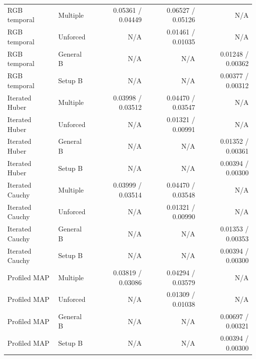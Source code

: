 \begin{longtable}{llrrr}
RGB temporal & Multiple & 0.05361 / 0.04449 & 0.06527 / 0.05126 & N/A\\
RGB temporal & Unforced & N/A & 0.01461 / 0.01035 & N/A\\
RGB temporal & General B & N/A & N/A & 0.01248 / 0.00362\\
RGB temporal & Setup B & N/A & N/A & 0.00377 / 0.00312\\
Iterated Huber & Multiple & 0.03998 / 0.03512 & 0.04470 / 0.03547 & N/A\\
Iterated Huber & Unforced & N/A & 0.01321 / 0.00991 & N/A\\
Iterated Huber & General B & N/A & N/A & 0.01352 / 0.00361\\
Iterated Huber & Setup B & N/A & N/A & 0.00394 / 0.00300\\
Iterated Cauchy & Multiple & 0.03999 / 0.03514 & 0.04470 / 0.03548 & N/A\\
Iterated Cauchy & Unforced & N/A & 0.01321 / 0.00990 & N/A\\
Iterated Cauchy & General B & N/A & N/A & 0.01353 / 0.00353\\
Iterated Cauchy & Setup B & N/A & N/A & 0.00394 / 0.00300\\
Profiled MAP & Multiple & 0.03819 / 0.03086 & 0.04294 / 0.03579 & N/A\\
Profiled MAP & Unforced & N/A & 0.01309 / 0.01038 & N/A\\
Profiled MAP & General B & N/A & N/A & 0.00697 / 0.00321\\
Profiled MAP & Setup B & N/A & N/A & 0.00394 / 0.00300\\
\bottomrule\end{longtable}\endgroup
